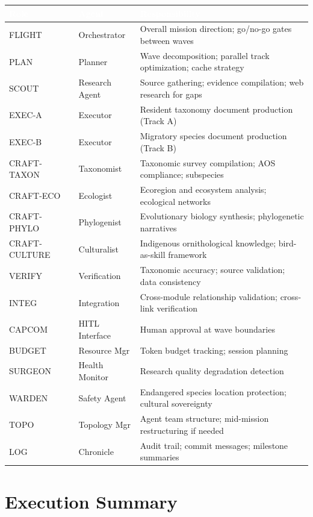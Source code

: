 \documentclass[11pt,letterpaper]{article}
\newcommand{\tableheader}[1]{\textbf{\sffamily\textcolor{white}{#1}}}
\begin{document}
\begin{center}
\begin{tabularx}{\textwidth}{L{2cm}L{2.5cm}X}
\toprule
{}
\tableheader{Role} & \tableheader{Agent} & \tableheader{Responsibility} \\
\midrule
FLIGHT & Orchestrator & Overall mission direction; go/no-go gates between waves \\
PLAN & Planner & Wave decomposition; parallel track optimization; cache strategy \\
SCOUT & Research Agent & Source gathering; evidence compilation; web research for gaps \\
EXEC-A & Executor & Resident taxonomy document production (Track A) \\
EXEC-B & Executor & Migratory species document production (Track B) \\
CRAFT-TAXON & Taxonomist & Taxonomic survey compilation; AOS compliance; subspecies \\
CRAFT-ECO & Ecologist & Ecoregion and ecosystem analysis; ecological networks \\
CRAFT-PHYLO & Phylogenist & Evolutionary biology synthesis; phylogenetic narratives \\
CRAFT-CULTURE & Culturalist & Indigenous ornithological knowledge; bird-as-skill framework \\
VERIFY & Verification & Taxonomic accuracy; source validation; data consistency \\
INTEG & Integration & Cross-module relationship validation; cross-link verification \\
CAPCOM & HITL Interface & Human approval at wave boundaries \\
BUDGET & Resource Mgr & Token budget tracking; session planning \\
SURGEON & Health Monitor & Research quality degradation detection \\
WARDEN & Safety Agent & Endangered species location protection; cultural sovereignty \\
TOPO & Topology Mgr & Agent team structure; mid-mission restructuring if needed \\
LOG & Chronicle & Audit trail; commit messages; milestone summaries \\
\bottomrule
\end{tabularx}
\end{center}

\section{Execution Summary}
\end{document}
